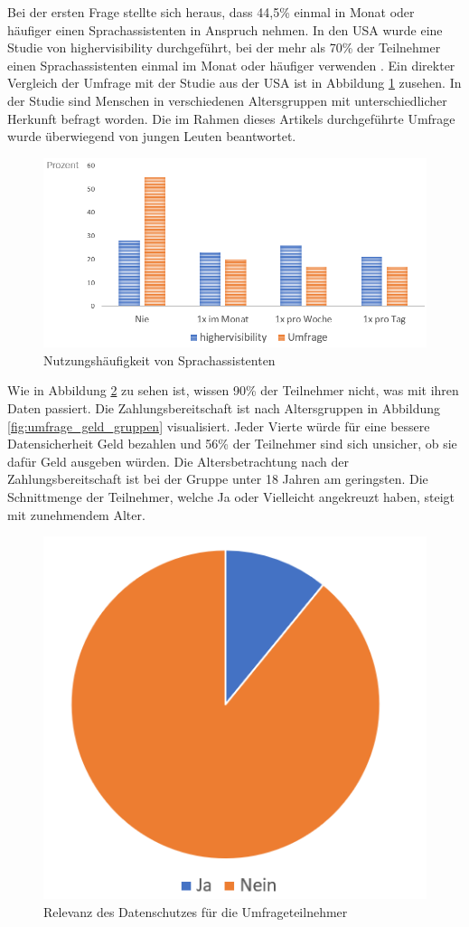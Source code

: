 Bei der ersten Frage stellte sich heraus, dass 44,5\% einmal in Monat oder häufiger einen Sprachassistenten in Anspruch nehmen. In den USA wurde eine Studie von \glqq highervisibility\grqq{} durchgeführt, bei der mehr als 70\% der Teilnehmer einen Sprachassistenten einmal im Monat oder häufiger verwenden \cite{highervisibility}.
Ein direkter Vergleich der Umfrage mit der Studie aus der USA ist in Abbildung \ref{fig:umfrage_haeufigkeit} zusehen. In der Studie sind Menschen in verschiedenen Altersgruppen mit unterschiedlicher Herkunft befragt worden. Die im Rahmen dieses Artikels durchgeführte Umfrage wurde überwiegend von jungen Leuten beantwortet.

\begin{figure}[h]
	\centering
	\includegraphics[width=0.9\linewidth]{Picture/umfrage_haeufigkeit}
	\caption[Nutzungshäufigkeit von Sprachassistenten]{Nutzungshäufigkeit von Sprachassistenten}
	\label{fig:umfrage_haeufigkeit}
\end{figure} 

Wie in Abbildung \ref{fig:umfrage_datenschutz} zu sehen ist, wissen 90\% der Teilnehmer nicht, was mit ihren Daten passiert. Die Zahlungsbereitschaft ist nach Altersgruppen in Abbildung \ref{fig:umfrage_geld_gruppen} visualisiert. Jeder Vierte würde für eine bessere Datensicherheit Geld bezahlen und 56\% der Teilnehmer sind sich unsicher, ob sie dafür Geld ausgeben würden. Die Altersbetrachtung nach der Zahlungsbereitschaft ist bei der Gruppe unter 18 Jahren am geringsten. Die Schnittmenge der Teilnehmer, welche Ja oder Vielleicht angekreuzt haben, steigt mit zunehmendem Alter.

\begin{figure}[h]
	\centering
	\includegraphics[width=0.5\linewidth]{Picture/umfrage_datenschutz}
	\caption[Relevanz des Datenschutzes für die Umfrageteilnehmer]{Relevanz des Datenschutzes für die Umfrageteilnehmer}
	\label{fig:umfrage_datenschutz}
\end{figure}


